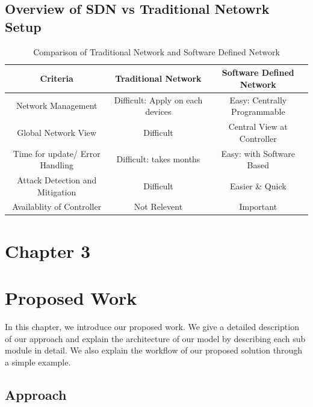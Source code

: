 \documentclass[12pt,letterpaper]{article}
\begin{document}
    \subsection{Overview of SDN vs Traditional Netowrk Setup}

        \begin{table}[ht]
            \centering
            \caption{Comparison of Traditional Network and Software Defined Network}
            \label{tab:network-comparison}
            \begin{tabular}{ccc}
            \toprule
            \textbf{Criteria} & \textbf{Traditional Network} & \textbf{Software Defined Network} \\
            \midrule
                Network Management & Difficult: Apply on each devices & Easy: Centrally Programmable \\
                Global Network View & Difficult & Central View at Controller \\
                Time for update/ Error Handling & Difficult: takes months & Easy: with Software Based \\
                Attack Detection and Mitigation & Difficult & Easier \& Quick \\
                Availablity of Controller & Not Relevent & Important \\
            \bottomrule
            \end{tabular}
        \end{table}
\clearpage    
    \newpage
    \section*{Chapter 3}
        \section{Proposed Work}
        In this chapter, we introduce our proposed work. We give a detailed description of our approach and explain the architecture of our model by describing each sub module in detail. We also explain the workflow of our proposed solution through a simple example.

        \subsection{Approach}
\end{document}
